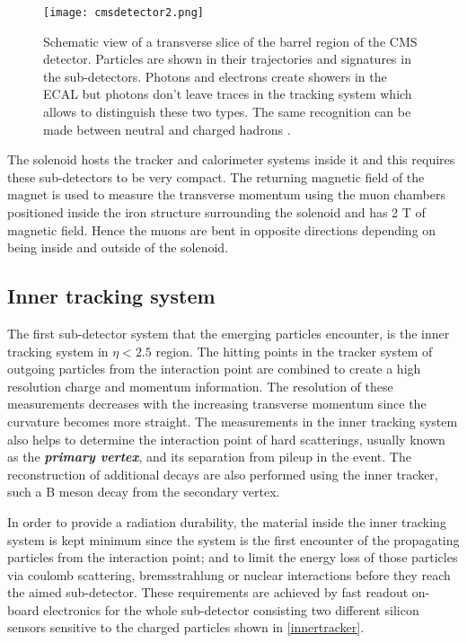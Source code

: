 \begin{figure}[ht]
	\centering
	\texttt{[image: cmsdetector2.png]}
	\vspace{2mm}
	\caption[Schematic view of a transverse slice of the barrel region of the CMS detector. Particles are shown in their trajectories and signatures in the sub-detectors. Photons and electrons create showers in the ECAL but photons don't leave traces in the tracking system which allows to distinguish these two types. The same recognition can be made between neutral and charged hadrons.]{Schematic view of a transverse slice of the barrel region of the CMS detector. Particles are shown in their trajectories and signatures in the sub-detectors. Photons and electrons create showers in the ECAL but photons don't leave traces in the tracking system which allows to distinguish these two types. The same recognition can be made between neutral and charged hadrons \cite{Barney:2120661}.}
	\label{cmsdetector2}
\end{figure}

The solenoid hosts the tracker and calorimeter systems inside it and this requires these sub-detectors to be very compact. The returning magnetic field of the magnet is used to measure the transverse momentum using the muon chambers positioned inside the iron structure surrounding the solenoid and has 2 T of magnetic field. Hence the muons are bent in opposite directions depending on being inside and outside of the solenoid.

\subsection{Inner tracking system}

The first sub-detector system that the emerging particles encounter, is the inner tracking system in $\eta < 2.5$ region. The hitting points in the tracker system of outgoing particles from the interaction point are combined to create a high resolution charge and momentum information. The resolution of these measurements decreases with the increasing transverse momentum since the curvature becomes more straight. The measurements in the inner tracking system also helps to determine the interaction point of hard scatterings, usually known as the \textbf{\emph{primary vertex}}, and its separation from pileup in the event. The reconstruction of additional decays are also performed using the inner tracker, such a B meson decay from the secondary vertex.

In order to provide a radiation durability, the material inside the inner tracking system is kept minimum since the system is the first encounter of the propagating particles from the interaction point; and to limit the energy loss of those particles via coulomb scattering, bremsstrahlung or nuclear interactions before they reach the aimed sub-detector. These requirements are achieved by fast readout on-board electronics for the whole sub-detector consisting two different silicon sensors sensitive to the charged particles shown in \autoref{innertracker}.

